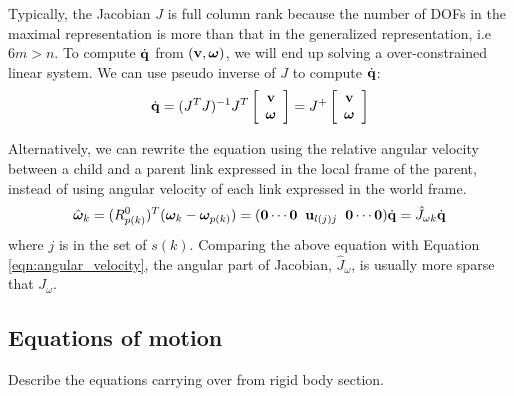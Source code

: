 Typically, the Jacobian $J$ is full column rank because the
number of DOFs in the maximal representation is more than that in the
generalized representation, i.e $6m > n$. To compute $\dot{\mathbf{q}}$ from $(\mathbf{v}, \bm{\omega})$, we
will end up solving a over-constrained linear system. We can use
pseudo inverse of $J$ to compute $\dot{\mathbf{q}}$:
\begin{equation}
 \dot{\mathbf{q}} = (J^TJ)^{-1}J^T
\left[
\begin{array}{c}
\mathbf{v} \\
\bm{\omega}
\end{array}
\right]
 = J^+
\left[
\begin{array}{c}
\mathbf{v} \\
\bm{\omega}
\end{array}
\right]
\end{equation}

Alternatively, we can rewrite the equation using the relative angular
velocity between a child and a parent link expressed in the local
frame of the parent, instead of using angular velocity of each link
expressed in the world frame.
\begin{equation}
\hat{\bm{\omega}}_k = (R^0_{p(k)})^T(\bm{\omega}_k - \bm{\omega}_{p(k)}) = (\mathbf{0} \cdots \mathbf{0} \;\; \mathbf{u}_{l(j)j} \;\; \mathbf{0}
\cdots \mathbf{0}) \dot{\mathbf{q}} = \hat{J}_{\omega k} \dot{\mathbf{q}} 
\end{equation}
where $j$ is in the set of $s(k)$. Comparing the above equation with Equation \ref{eqn:angular_velocity},
the angular part of Jacobian, $\hat{J}_\omega$, is usually more sparse
that $J_\omega$.


\subsection{Equations of motion}
Describe the equations carrying over from rigid body section.


